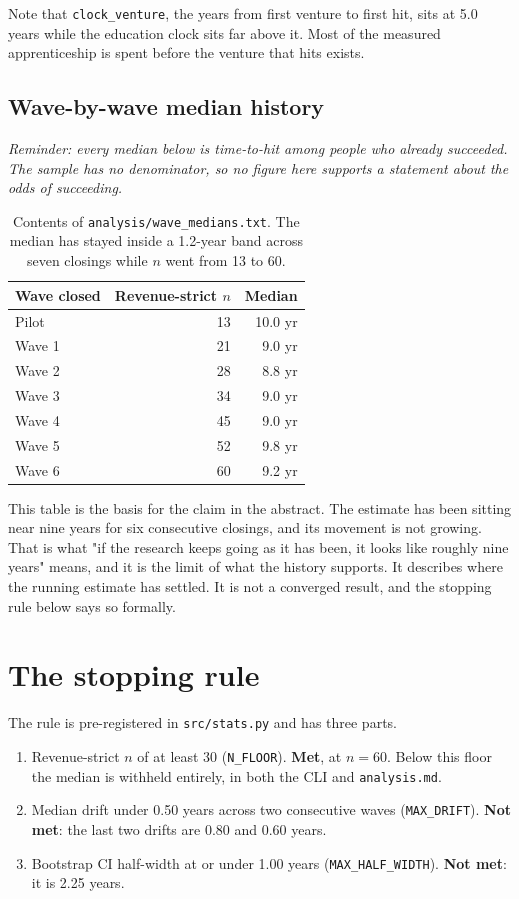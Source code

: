 \documentclass[11pt]{article}
\newcommand{\caveat}{\emph{\small Reminder: every median below is time-to-hit
among people who already succeeded. The sample has no denominator, so no figure
here supports a statement about the odds of succeeding.}\par\medskip}
\begin{document}
Note that \texttt{clock\_venture}, the years from first venture to first hit,
sits at 5.0 years while the education clock sits far above it. Most of the
measured apprenticeship is spent before the venture that hits exists.

\subsection{Wave-by-wave median history}

\caveat

\begin{table}[h]
\centering
\begin{tabular}{lrr}
\toprule
Wave closed & Revenue-strict $n$ & Median \\
\midrule
Pilot  & 13 & 10.0 yr \\
Wave 1 & 21 & 9.0 yr \\
Wave 2 & 28 & 8.8 yr \\
Wave 3 & 34 & 9.0 yr \\
Wave 4 & 45 & 9.0 yr \\
Wave 5 & 52 & 9.8 yr \\
Wave 6 & 60 & 9.2 yr \\
\bottomrule
\end{tabular}
\caption{Contents of \texttt{analysis/wave\_medians.txt}. The median has stayed
inside a 1.2-year band across seven closings while $n$ went from 13 to 60.}
\end{table}

This table is the basis for the claim in the abstract. The estimate has been
sitting near nine years for six consecutive closings, and its movement is not
growing. That is what "if the research keeps going as it has been, it looks
like roughly nine years" means, and it is the limit of what the history
supports. It describes where the running estimate has settled. It is not a
converged result, and the stopping rule below says so formally.

\section{The stopping rule}

The rule is pre-registered in \texttt{src/stats.py} and has three parts.

\begin{enumerate}
\item Revenue-strict $n$ of at least 30 (\texttt{N\_FLOOR}). \textbf{Met}, at
      $n = 60$. Below this floor the median is withheld entirely, in both the
      CLI and \texttt{analysis.md}.
\item Median drift under 0.50 years across two consecutive waves
      (\texttt{MAX\_DRIFT}). \textbf{Not met}: the last two drifts are 0.80 and
      0.60 years.
\item Bootstrap CI half-width at or under 1.00 years
      (\texttt{MAX\_HALF\_WIDTH}). \textbf{Not met}: it is 2.25 years.
\end{enumerate}
\end{document}
